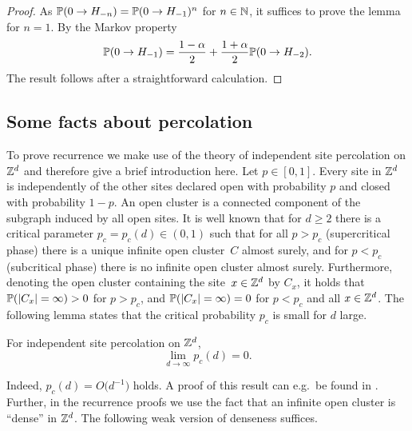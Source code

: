 \begin{proof}
 As $\P(0\to H_{-n}) = \P(0\to H_{-1})^n$ for $n \in \N$, it suffices to prove the lemma for $n =1$. By the Markov property
 \begin{equation*}
  \P(0\to H_{-1}) = \frac{1-\alpha}{2} + \frac{1+\alpha}{2} \P(0\to H_{-2}).
 \end{equation*}
 The result follows after a straightforward calculation.
\end{proof}






\subsection*{Some facts about percolation}

To prove recurrence we make use of the theory of independent site percolation on $\Z^d$ and therefore give a brief introduction here.
Let $p \in [0,1]$. Every site in $\Z^d$ is independently of the other sites declared open with probability $p$ and closed with probability $1-p$. An open cluster is a connected component of the subgraph induced by all open sites. It is well known that for $d \geq 2$ there is a critical parameter $p_c= p_c(d) \in (0,1)$ such that for all $p > p_c$ (supercritical phase) there is a unique infinite open cluster~$C$ almost surely, and for $p<p_c$ (subcritical phase) there is no infinite open cluster almost surely. Furthermore, denoting the open cluster containing the site~$x \in \Z^d$ by $C_x$, it holds that $\P(\lvert C_x \rvert=\infty)>0$ for $p>p_c$, and $\P(\lvert C_x \rvert=\infty)=0$ for $p<p_c$ and all $x \in \Z^d$. The following lemma states that the critical probability $p_c$ is small for $d$ large.

\begin{lemma}\label{lemma_pc_high_d}
For independent site percolation on $\Z^d$, 
\begin{equation*}
\lim_{d \to \infty} p_c(d) = 0.
\end{equation*}
\end{lemma}

Indeed, $p_c(d) = O\bigl(d^{-1}\bigr)$ holds. A proof of this result can e.g.~be found in \cite[Chapter~1, Theorem~7]{BR06}. Further, in the recurrence proofs we use the fact that an infinite open cluster is ``dense'' in $\Z^d$. The following weak version of denseness suffices.

